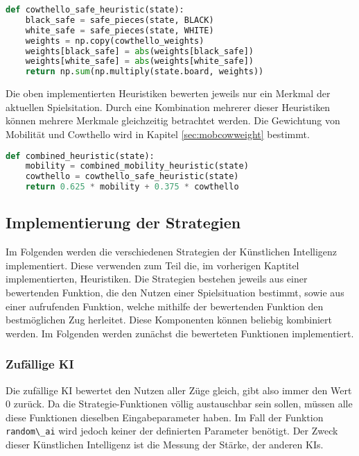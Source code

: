 \begin{lstlisting}[language=Python]
def cowthello_safe_heuristic(state):
    black_safe = safe_pieces(state, BLACK)
    white_safe = safe_pieces(state, WHITE)
    weights = np.copy(cowthello_weights)
    weights[black_safe] = abs(weights[black_safe])
    weights[white_safe] = abs(weights[white_safe])
    return np.sum(np.multiply(state.board, weights))
\end{lstlisting}

Die oben implementierten Heuristiken bewerten jeweils nur ein Merkmal
der aktuellen Spielsitation. Durch eine Kombination mehrerer dieser
Heuristiken können mehrere Merkmale gleichzeitig betrachtet werden. Die
Gewichtung von Mobilität und Cowthello wird in Kapitel
\ref{sec:mobcowweight} bestimmt.

\begin{lstlisting}[language=Python]
def combined_heuristic(state):
    mobility = combined_mobility_heuristic(state)
    cowthello = cowthello_safe_heuristic(state)
    return 0.625 * mobility + 0.375 * cowthello
\end{lstlisting}

\hypertarget{implementierung-der-strategien}{%
\subsection{Implementierung der
Strategien}\label{implementierung-der-strategien}}

Im Folgenden werden die verschiedenen Strategien der Künstlichen
Intelligenz implementiert. Diese verwenden zum Teil die, im vorherigen
Kaptitel implementierten, Heuristiken. Die Strategien bestehen jeweils
aus einer bewertenden Funktion, die den Nutzen einer Spielsituation
bestimmt, sowie aus einer aufrufenden Funktion, welche mithilfe der
bewertenden Funktion den bestmöglichen Zug herleitet. Diese Komponenten
können beliebig kombiniert werden. Im Folgenden werden zunächst die
bewerteten Funktionen implementiert.

\hypertarget{zufuxe4llige-ki}{%
\subsubsection{Zufällige KI}\label{zufuxe4llige-ki}}

Die zufällige KI bewertet den Nutzen aller Züge gleich, gibt also immer
den Wert \(0\) zurück. Da die Strategie-Funktionen völlig austauschbar
sein sollen, müssen alle diese Funktionen dieselben Eingabeparameter
haben. Im Fall der Funktion \passthrough{\lstinline!random\_ai!} wird
jedoch keiner der definierten Parameter benötigt. Der Zweck dieser
Künstlichen Intelligenz ist die Messung der Stärke, der anderen KIs.

